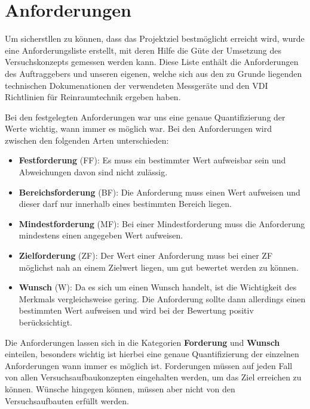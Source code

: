 \section{Anforderungen}
Um sicherstllen zu k\"{o}nnen, dass das Projektziel bestm\"{o}glicht erreicht wird, wurde eine Anforderungsliste erstellt, mit deren Hilfe die G\"{u}te der Umsetzung des Versuchskonzepts gemessen werden kann. Diese Liste enth\"{a}lt die Anforderungen des Auftraggebers und unseren eigenen, welche sich aus den zu Grunde liegenden technischen Dokumenationen der verwendeten Messger\"{a}te und den VDI Richtlinien f\"{u}r Reinraumtechnik ergeben haben.

Bei den festgelegten Anforderungen war uns eine genaue Quantifizierung der Werte wichtig, wann immer es m\"{o}glich war. Bei den Anforderungen wird zwischen den folgenden Arten unterschieden:

\begin{itemize}
	\item \textbf{Festforderung} (FF): Es muss ein bestimmter Wert aufweisbar sein und Abweichungen davon sind nicht zul\"{a}ssig.
	
	\item \textbf{Bereichsforderung} (BF): Die Anforderung muss einen Wert aufweisen und dieser darf nur innerhalb eines bestimmten Bereich liegen.
	
	\item \textbf{Mindestforderung} (MF): Bei einer Mindestforderung muss die Anforderung mindestens einen angegeben Wert aufweisen.
	
	\item \textbf{Zielforderung} (ZF): Der Wert einer Anforderung muss bei einer ZF m\"{o}glichst nah an einem Zielwert liegen, um gut bewertet werden zu k\"{o}nnen.
	
	\item \textbf{Wunsch} (W): Da es sich um einen Wunsch handelt, ist die Wichtigkeit des Merkmals vergleichsweise gering. Die Anforderung sollte dann allerdings einen bestimmten Wert aufweisen und wird bei der Bewertung positiv ber\"{u}cksichtigt. 
\end{itemize} 

Die Anforderungen lassen sich in die Kategorien \textbf{Forderung} und \textbf{Wunsch} einteilen, besonders wichtig ist hierbei eine genaue Quantifizierung der einzelnen Anforderungen wann immer es m\"{o}glich ist. Forderungen m\"{u}ssen auf jeden Fall von allen Versuchsaufbaukonzepten eingehalten werden, um das Ziel erreichen zu k\"{o}nnen. W\"{u}nsche hingegen k\"{o}nnen, m\"{u}ssen aber nicht von den Versuchsaufbauten erf\"{u}llt werden.

